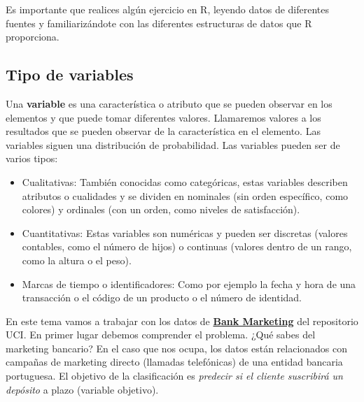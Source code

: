 \documentclass[
  letterpaper,
  DIV=11,
  numbers=noendperiod]{scrreprt}
\begin{document}
\begin{tcolorbox}[enhanced jigsaw, arc=.35mm, breakable, coltitle=black, left=2mm, opacityback=0, bottomtitle=1mm, colbacktitle=quarto-callout-caution-color!10!white, title=\textcolor{quarto-callout-caution-color}{\faFire}\hspace{0.5em}{Práctica}, titlerule=0mm, colback=white, colframe=quarto-callout-caution-color-frame, bottomrule=.15mm, rightrule=.15mm, opacitybacktitle=0.6, toptitle=1mm, toprule=.15mm, leftrule=.75mm]

Es importante que realices algún ejercicio en R, leyendo datos de
diferentes fuentes y familiarizándote con las diferentes estructuras de
datos que R proporciona.

\end{tcolorbox}

\hypertarget{tipo-de-variables}{%
\subsection{Tipo de variables}\label{tipo-de-variables}}

Una \textbf{variable} es una característica o atributo que se pueden
observar en los elementos y que puede tomar diferentes valores.
Llamaremos valores a los resultados que se pueden observar de la
característica en el elemento. Las variables siguen una distribución de
probabilidad. Las variables pueden ser de varios tipos:

\begin{itemize}
\item
  Cualitativas: También conocidas como categóricas, estas variables
  describen atributos o cualidades y se dividen en nominales (sin orden
  específico, como colores) y ordinales (con un orden, como niveles de
  satisfacción).
\item
  Cuantitativas: Estas variables son numéricas y pueden ser discretas
  (valores contables, como el número de hijos) o continuas (valores
  dentro de un rango, como la altura o el peso).
\item
  Marcas de tiempo o identificadores: Como por ejemplo la fecha y hora
  de una transacción o el código de un producto o el número de
  identidad.
\end{itemize}

En este tema vamos a trabajar con los datos de
\href{https://archive.ics.uci.edu/dataset/222/bank+marketing}{\textbf{Bank
Marketing}} del repositorio UCI. En primer lugar debemos comprender el
problema. ¿Qué sabes del marketing bancario? En el caso que nos ocupa,
los datos están relacionados con campañas de marketing directo (llamadas
telefónicas) de una entidad bancaria portuguesa. El objetivo de la
clasificación es \emph{predecir si el cliente suscribirá un depósito} a
plazo (variable objetivo).
\end{document}
